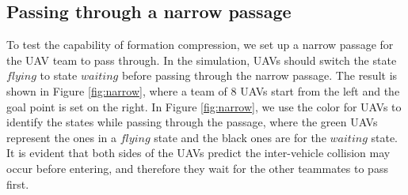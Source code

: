 \subsection{Passing through a narrow passage}
To test the capability of formation compression, we set up a narrow passage for the UAV team to pass through. In the simulation, UAVs should switch the state $flying$ to state $waiting$ before passing through the narrow passage. The result is shown in Figure \ref{fig:narrow}, where a team of 8 UAVs start from the left and the goal point is set on the right. In Figure \ref{fig:narrow}, we use the color for UAVs to identify the states while passing through the passage, where the green UAVs represent the ones in a $flying$ state and the black ones are for the $waiting$ state. It is evident that both sides of the UAVs predict the inter-vehicle collision may occur before entering, and therefore they wait for the other teammates to pass first.

